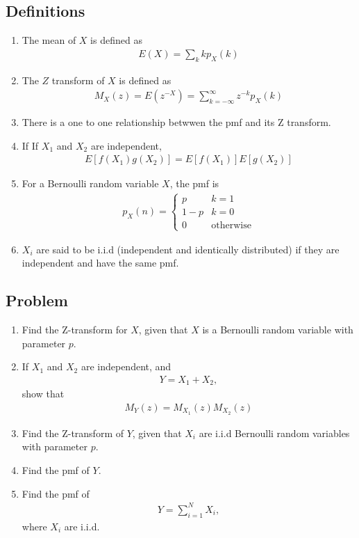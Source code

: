 \documentclass[journal,12pt,onecolumn]{IEEEtran}
\renewcommand\thesection{\arabic{section}}
\renewcommand\thesubsection{\thesection.\arabic{subsection}}
\providecommand{\sbrak}[1]{\ensuremath{{}\left[#1\right]}}
\providecommand{\brak}[1]{\ensuremath{\left(#1\right)}}
\theoremstyle{remark}
\numberwithin{equation}{section}
\begin{document}
\subsection{Definitions}
\begin{enumerate}[label=\arabic*.,ref=\thesubsection.\theenumi]
\item The mean of $X$ is defined as
\begin{align}
E\brak{X} = \sum_{k}kp_X(k)
\end{align}
	\item The $Z$ transform of $X$ is defined as
	\begin{align}
	M_X(z)=E\brak{z^{-X}} = \sum_{k = -\infty}^{\infty}z^{-k}p_X(k)
	\end{align}
	\item There is a one to one relationship betwwen the pmf and its Z transform.
\item If 	If $X_1$ and $X_2$ are independent, 
	\begin{align}
	E\sbrak{f\brak{X_1}g\brak{X_2}} = 	E\sbrak{f\brak{X_1}} 	E\sbrak{g\brak{X_2}} 
	\end{align}

    \item For a Bernoulli random variable $X$, the pmf is
    \begin{align}
    p_X(n) =
    \begin{cases}
p & k = 1
\\
1-p & k = 0
\\
0 & \text{otherwise}
    \end{cases}
\end{align}
\item $X_i$ are said to be i.i.d (independent and identically distributed) if they are independent and have the same pmf.
\end{enumerate}
\subsection{Problem}
\begin{enumerate}[label=\arabic*.,ref=\thesubsection.\theenumi]
\item Find the Z-transform for  $X$, given that $X$ is a Bernoulli random variable with parameter $p$.
	\item If $X_1$ and $X_2$ are independent, and
		\begin{align}
Y = X_1 + X_2,
	\end{align}
	show that 
			\begin{align}
		M_{Y}(z)= 	M_{X_1}(z)		M_{X_2}(z)
			\end{align}
			\item Find the Z-transform of $Y$, given that $X_i$  are i.i.d  Bernoulli random variables with parameter $p$.
			\item Find the pmf of $Y$.
			\item Find the pmf of 
		\begin{align}
Y = \sum_{i=1}^{N}X_i, 
	\end{align}
	where $X_i$ are i.i.d.
			
\end{enumerate}
\end{document}
